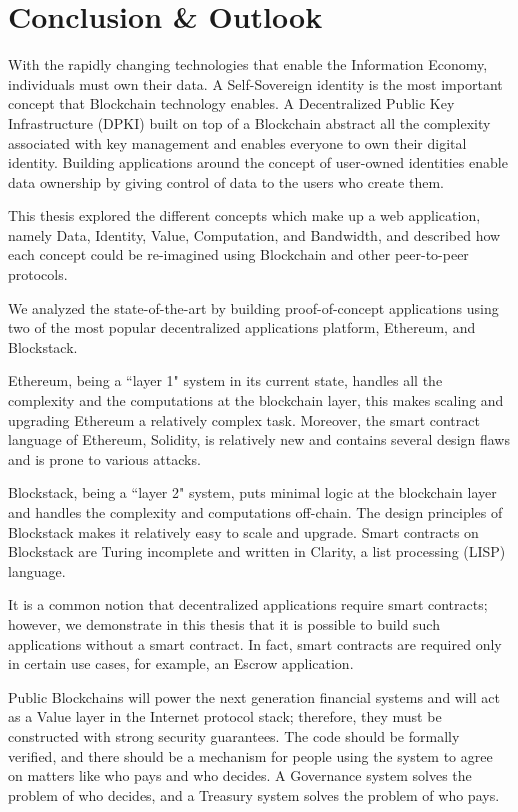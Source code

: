 \chapter{Conclusion \& Outlook}\label{chapter::conclusion}
With the rapidly changing technologies that enable the Information Economy, individuals must own their data. A Self-Sovereign identity is the most important concept that Blockchain technology enables. A Decentralized Public Key Infrastructure (DPKI) built on top of a Blockchain abstract all the complexity associated with key management and enables everyone to own their digital identity. Building applications around the concept of user-owned identities enable data ownership by giving control of data to the users who create them.

This thesis explored the different concepts which make up a web application, namely Data, Identity, Value, Computation, and Bandwidth, and described how each concept could be re-imagined using Blockchain and other peer-to-peer protocols.

We analyzed the state-of-the-art by building proof-of-concept applications using two of the most popular decentralized applications platform, Ethereum, and Blockstack. 

Ethereum, being a ``layer 1" system in its current state, handles all the complexity and the computations at the blockchain layer, this makes scaling and upgrading Ethereum a relatively complex task. Moreover, the smart contract language of Ethereum, Solidity, is relatively new and contains several design flaws and is prone to various attacks.

Blockstack, being a ``layer 2" system, puts minimal logic at the blockchain layer and handles the complexity and computations off-chain. The design principles of Blockstack makes it relatively easy to scale and upgrade. Smart contracts on Blockstack are Turing incomplete and written in Clarity, a list processing (LISP) language.

It is a common notion that decentralized applications require smart contracts; however, we demonstrate in this thesis that it is possible to build such applications without a smart contract. In fact, smart contracts are required only in certain use cases, for example, an Escrow application.

Public Blockchains will power the next generation financial systems and will act as a Value layer in the Internet protocol stack; therefore, they must be constructed with strong security guarantees. The code should be formally verified, and there should be a mechanism for people using the system to agree on matters like who pays and who decides. A Governance system solves the problem of who decides, and a Treasury system solves the problem of who pays.

